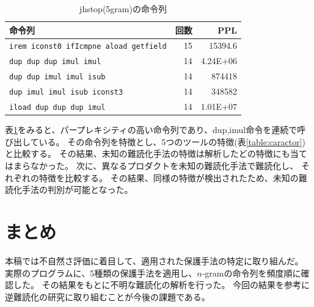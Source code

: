\documentclass[a4j,fleqn,10pt]{jarticle}
\begin{document}
\begin{table}[t]
  \centering
  \footnotesize{
    \caption{jhstop(5gram)の命令列}\label{table:jhstop}
  \begin{tabular}{l|r|r}
    命令列 &
    回数 & 
    PPL \\ \hline
    \texttt{irem iconst0 ifIcmpne aload getfield}     & 15 & 15394.6 \\
    \texttt{dup dup dup imul imul}                    & 14 & 4.24E+06 \\
    \texttt{dup dup imul imul isub}                   & 14 & 874418 \\
    \texttt{dup imul imul isub iconst3}               & 14 & 348582 \\
    \texttt{iload dup dup dup imul}                   & 14 & 1.01E+07 \\
    \end{tabular}}
\end{table}
表\ref{table:jhstop}をみると、パープレキシティの高い命令列であり、dup,imul命令を連続で呼び出している。
その命令列を特徴とし、5つのツールの特徴(表\ref{table:caractor})と比較する。
その結果、未知の難読化手法の特徴は解析したどの特徴にも当てはまらなかった。
次に、異なるプロダクトを未知の難読化手法で難読化し、
それぞれの特徴を比較する。
その結果、同様の特徴が検出されたため、未知の難読化手法の判別が可能となった。
 
 \section{まとめ}
 本稿では不自然さ評価に着目して、適用された保護手法の特定に取り組んだ。
実際のプログラムに、5種類の保護手法を適用し、$n$-gramの命令列を頻度順に確認した。
その結果をもとに不明な難読化の解析を行った。
今回の結果を参考に逆難読化の研究に取り組むことが今後の課題である。




\end{document}
